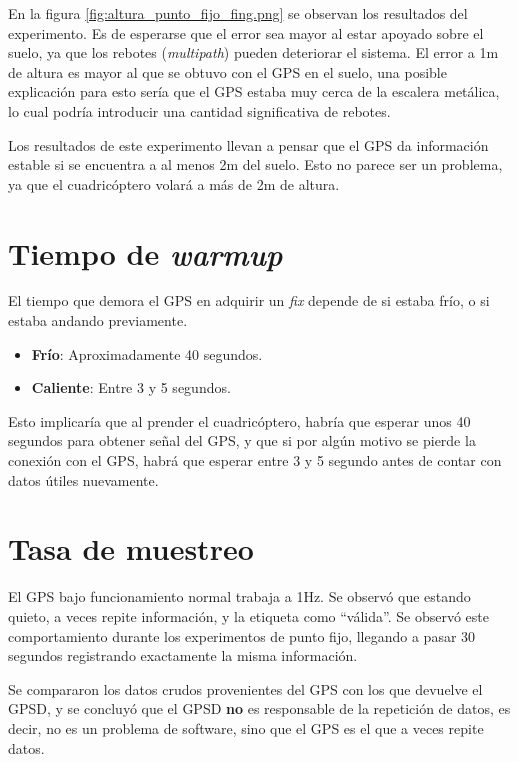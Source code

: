 \documentclass[spanish,12pt,a4paper,titlepage]{report}
\begin{document}
En la figura \ref{fig:altura_punto_fijo_fing.png} se observan los resultados del experimento. Es de esperarse que el error sea mayor al estar apoyado sobre el suelo, ya que los rebotes (\textit{multipath}) pueden deteriorar el sistema. El error a 1m de altura es mayor al que se obtuvo con el GPS en el suelo, una posible explicación para esto sería que el GPS estaba muy cerca de la escalera metálica, lo cual podría introducir una cantidad significativa de rebotes.

Los resultados de este experimento llevan a pensar que el GPS da información estable si se encuentra a al menos 2m del suelo. Esto no parece ser un problema, ya que el cuadricóptero volará a más de 2m de altura.

\newpage
\section{Tiempo de \textit{warmup}}
\label{sec:tiempo-de-warmup}

El tiempo que demora el GPS en adquirir un \textit{fix} depende de si estaba frío, o si estaba andando previamente.
\begin{itemize}
\item \textbf{Frío}: Aproximadamente 40 segundos.
\item \textbf{Caliente}: Entre 3 y 5 segundos.
\end{itemize}

Esto implicaría que al prender el cuadricóptero, habría que esperar unos 40 segundos para obtener señal del GPS, y que si por algún motivo se pierde la conexión con el GPS, habrá que esperar entre 3 y 5 segundo antes de contar con datos útiles nuevamente.

\section{Tasa de muestreo}
\label{sec:tasa-de-muestreo}

El GPS bajo funcionamiento normal trabaja a 1Hz. Se observó que estando quieto, a veces repite información, y la etiqueta como ``válida''. Se observó este comportamiento durante los experimentos de punto fijo, llegando a pasar 30 segundos registrando exactamente la misma información.

Se compararon los datos crudos provenientes del GPS con los que devuelve el GPSD, y se concluyó que el GPSD \textbf{no} es responsable de la repetición de datos, es decir, no es un problema de software, sino que el GPS es el que a veces repite datos.
\end{document}
